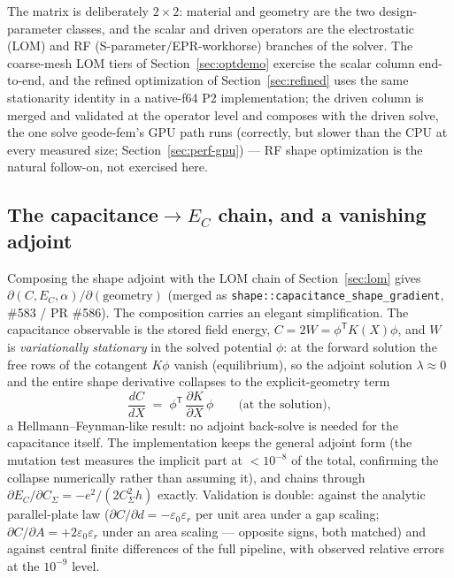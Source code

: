 \documentclass{anvil-paper}
\begin{document}
The matrix is deliberately $2\times 2$: material and geometry are the two
design-parameter classes, and the scalar and driven operators are the
electrostatic (LOM) and RF (S-parameter/EPR-workhorse) branches of the
solver. The coarse-mesh LOM tiers of Section~\ref{sec:optdemo} exercise
the scalar column end-to-end, and the refined optimization of
Section~\ref{sec:refined} uses the same stationarity identity in a
native-f64 P2 implementation; the driven column is merged and validated at
the operator level and composes with the driven solve, the one solve
geode-fem's GPU path runs (correctly, but slower than the CPU at every
measured size; Section~\ref{sec:perf-gpu}) --- RF shape optimization is
the natural follow-on, not exercised here.

\subsection{The \texorpdfstring{capacitance$\to E_C$}{capacitance-to-E\_C} chain, and a vanishing adjoint}
\label{sec:chain}

Composing the shape adjoint with the LOM chain of Section~\ref{sec:lom}
gives $\partial(C, E_C, \alpha)/\partial(\text{geometry})$ (merged as
\texttt{shape::capacitance\_shape\_gradient}, \#583 / PR \#586). The
composition carries an elegant simplification. The capacitance observable
is the stored field energy, $C = 2W = \phi^{\mathsf{T}}K(X)\phi$, and $W$
is \emph{variationally stationary} in the solved potential $\phi$: at the
forward solution the free rows of the cotangent $K\phi$ vanish
(equilibrium), so the adjoint solution $\lambda \approx 0$ and the entire
shape derivative collapses to the explicit-geometry term
\begin{equation}
  \frac{dC}{dX}
  \;=\; \phi^{\mathsf{T}}\,\frac{\partial K}{\partial X}\,\phi
  \qquad\text{(at the solution)},
  \label{eq:hf}
\end{equation}
a Hellmann--Feynman-like result: no adjoint back-solve is needed for the
capacitance itself. The implementation keeps the general adjoint form
(the mutation test measures the implicit part at $<10^{-8}$ of the
total, confirming the collapse numerically rather than assuming it), and
chains through $\partial E_C/\partial C_\Sigma = -e^2/(2C_\Sigma^2 h)$
exactly. Validation is double: against the analytic parallel-plate law
($\partial C/\partial d = -\varepsilon_0\varepsilon_r$ per unit area
under a gap scaling; $\partial C/\partial A = +2\varepsilon_0
\varepsilon_r$ under an area scaling --- opposite signs, both matched)
and against central finite differences of the full pipeline, with
observed relative errors at the $10^{-9}$ level.
\end{document}
